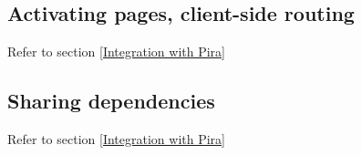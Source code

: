 \documentclass[a4paper]{book}
\begin{document}


\subsection{Activating pages, client-side routing}

Refer to section \ref{Integration with Pira}
 
\subsection{Sharing dependencies}

Refer to section \ref{Integration with Pira}
\end{document}
